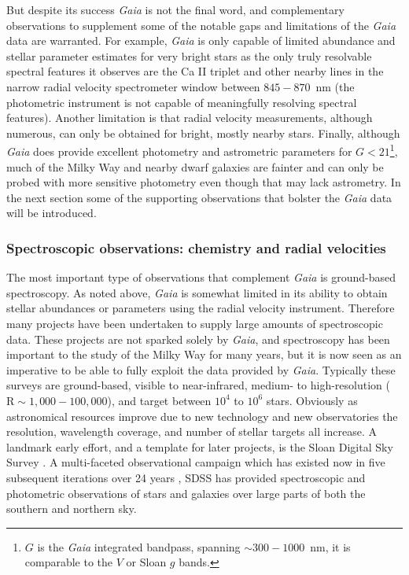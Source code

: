 But despite its success \textit{Gaia} is not the final word, and complementary observations to supplement some of the notable gaps and limitations of the \textit{Gaia} data are warranted. For example, \textit{Gaia} is only capable of limited abundance and stellar parameter estimates for very bright stars as the only truly resolvable spectral features it observes are the Ca II triplet and other nearby lines in the narrow radial velocity spectrometer window between $845-870$~nm (the photometric instrument is not capable of meaningfully resolving spectral features). Another limitation is that radial velocity measurements, although numerous, can only be obtained for bright, mostly nearby stars. Finally, although \textit{Gaia} does provide excellent photometry and astrometric parameters for $G < 21$\footnote{$G$ is the \textit{Gaia} integrated bandpass, spanning $\sim 300-1000$~nm, it is comparable to the $V$ or Sloan $g$ bands.}, much of the Milky Way and nearby dwarf galaxies are fainter and can only be probed with more sensitive photometry even though that may lack astrometry. In the next section some of the supporting observations that bolster the \textit{Gaia} data will be introduced.

\subsubsection{Spectroscopic observations: chemistry and radial velocities}

The most important type of observations that complement \textit{Gaia} is ground-based spectroscopy. As noted above, \textit{Gaia} is somewhat limited in its ability to obtain stellar abundances or parameters using the radial velocity instrument. Therefore many projects have been undertaken to supply large amounts of spectroscopic data. These projects are not sparked solely by \textit{Gaia}, and spectroscopy has been important to the study of the Milky Way for many years, but it is now seen as an imperative to be able to fully exploit the data provided by \textit{Gaia}. Typically these surveys are ground-based, visible to near-infrared, medium- to high-resolution ($\mathrm{R} \sim 1,000-100,000$), and target between $10^{4}$ to $10^{6}$ stars. Obviously as astronomical resources improve due to new technology and new observatories the resolution, wavelength coverage, and number of stellar targets all increase. A landmark early effort, and a template for later projects, is the Sloan Digital Sky Survey \parencite[][]{sdss}. A multi-faceted observational campaign which has existed now in five subsequent iterations over 24 years \parencite[see ][for the third and fourth generations]{sdss3,sdss4}, SDSS has provided spectroscopic and photometric observations of stars and galaxies over large parts of both the southern and northern sky.

